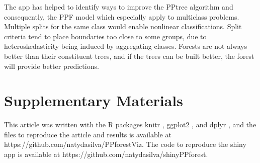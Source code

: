 \documentclass[smallextended,natbib]{svjour3}\usepackage[]{graphicx}\usepackage[]{xcolor}
\begin{document}
The app has helped to identify ways to improve the PPtree algorithm and consequently, the PPF model which especially apply to multiclass problems. Multiple splits for the same class would enable nonlinear classifications. Split criteria tend to place boundaries too close to some groups, due to heteroskedasticity being induced by aggregating classes. Forests are not always better than their constituent trees, and if the trees can be built better, the forest will provide better predictions.

\section{Supplementary Materials}
This article was written with the R packages knitr \citep{xie:2015}, ggplot2 \citep{hadley:2009}, and dplyr \citep{dplyr}, and the files to reproduce the article and results is available at https://github.com/natydasilva/PPforestViz. The code to reproduce the shiny app is available at https://github.com/natydasilva/shinyPPforest.



\end{document}
